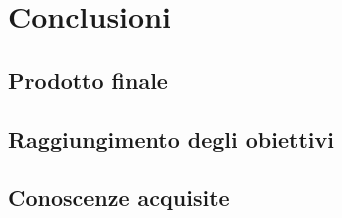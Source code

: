 
\chapter{Conclusioni}
\label{cap:conclusioni}

\section{Prodotto finale}

\section{Raggiungimento degli obiettivi}

\section{Conoscenze acquisite}
